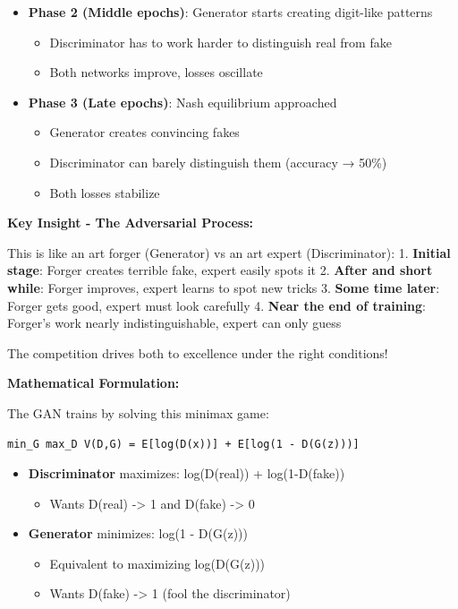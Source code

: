 \documentclass[11pt]{article}
\providecommand{\tightlist}{%
      \setlength{\itemsep}{0pt}\setlength{\parskip}{0pt}}
\begin{document}
\begin{itemize}
\tightlist
\item
  \textbf{Phase 2 (Middle epochs)}: Generator starts creating digit-like
  patterns

  \begin{itemize}
  \tightlist
  \item
    Discriminator has to work harder to distinguish real from fake
  \item
    Both networks improve, losses oscillate
  \end{itemize}
\item
  \textbf{Phase 3 (Late epochs)}: Nash equilibrium approached

  \begin{itemize}
  \tightlist
  \item
    Generator creates convincing fakes
  \item
    Discriminator can barely distinguish them (accuracy → 50\%)
  \item
    Both losses stabilize
  \end{itemize}
\end{itemize}

\textbf{Key Insight - The Adversarial Process:}

This is like an art forger (Generator) vs an art expert (Discriminator):
1. \textbf{Initial stage}: Forger creates terrible fake, expert easily
spots it 2. \textbf{After and short while}: Forger improves, expert
learns to spot new tricks 3. \textbf{Some time later}: Forger gets good,
expert must look carefully 4. \textbf{Near the end of training}:
Forger's work nearly indistinguishable, expert can only guess

The competition drives both to excellence under the right conditions!

\textbf{Mathematical Formulation:}

The GAN trains by solving this minimax game:

\begin{verbatim}
min_G max_D V(D,G) = E[log(D(x))] + E[log(1 - D(G(z)))]
\end{verbatim}

\begin{itemize}
\tightlist
\item
  \textbf{Discriminator} maximizes: log(D(real)) + log(1-D(fake))

  \begin{itemize}
  \tightlist
  \item
    Wants D(real) -\textgreater{} 1 and D(fake) -\textgreater{} 0
  \end{itemize}
\item
  \textbf{Generator} minimizes: log(1 - D(G(z)))

  \begin{itemize}
  \tightlist
  \item
    Equivalent to maximizing log(D(G(z)))
  \item
    Wants D(fake) -\textgreater{} 1 (fool the discriminator)
  \end{itemize}
\end{itemize}
\end{document}
